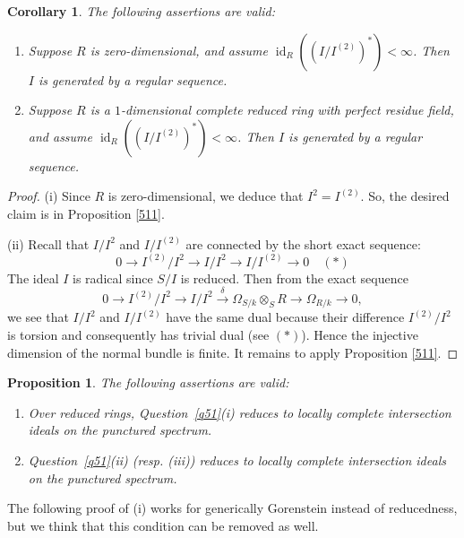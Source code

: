 \documentclass[10. pt,a4paper]{amsart}
\newtheorem{proposition}[theorem]{Proposition}
\newtheorem{corollary}[theorem]{Corollary}
\theoremstyle{definition}
\theoremstyle{remark}
\newcommand{\id}{\operatorname{id}}
\begin{document}
\begin{corollary}\label{511a}	The following assertions are valid:

	\begin{enumerate}
	\item[(i)]  Suppose $R$ is zero-dimensional, and assume $\id_R((I/I^{(2)})^\ast) < \infty$. Then $I$ is generated by a regular sequence.  
	\item[(ii)] Suppose $R$ is a $1$-dimensional complete reduced ring with perfect residue field, and assume $\id_R((I/I^{(2)})^\ast) < \infty$. Then $I$ is generated by a regular sequence.  
\end{enumerate}	
\end{corollary}

\begin{proof}
(i) Since $R$ is zero-dimensional, we deduce that 
$ I^2=I^{(2)}$. So, the desired claim is in {Proposition} \ref{511}.


(ii) Recall that $I/I^2$ and $I/I^{(2)}$ are connected by the short exact sequence:\[
0 \longrightarrow I^{(2)}/I^2 \longrightarrow I/I^2 \longrightarrow I/I^{(2)} \longrightarrow 0 \quad(\ast)
\]	The ideal $I$ is radical since $S/I$ is reduced. Then from the exact sequence
	\[
	0 \longrightarrow I^{(2)}/I^2 \longrightarrow I/I^2 \stackrel{\delta}{\longrightarrow} \Omega_{S/k} \otimes_S R \longrightarrow \Omega_{R/k} \longrightarrow 0,
	\]
	we see that $I/I^2$ and $I/I^{(2)}$ have the same dual because their difference $I^{(2)}/I^2$ is torsion and consequently has trivial dual (see $(\ast)$). Hence the injective dimension of the normal bundle is finite. It remains to apply Proposition \ref{511}.
\end{proof}

\begin{proposition}	The following assertions are valid:
	
	\begin{enumerate}
		\item[(i)]  Over reduced rings, Question~\ref{q51}(i) reduces to locally complete intersection ideals on the punctured spectrum.
		\item[(ii)] Question~\ref{q51}(ii) (resp. (iii)) reduces to locally complete intersection ideals on the punctured spectrum.  
	\end{enumerate}	
	
\end{proposition}

The following proof of (i) works for generically Gorenstein instead of reducedness, but we think that this condition can be removed as well.
\end{document}
